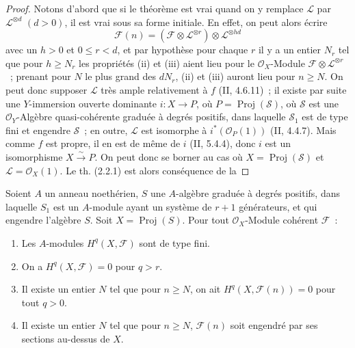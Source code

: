 \begin{proof}
Notons d'abord que si le théorème est vrai quand on y remplace
$\mathcal L$ par $\mathcal L^{\otimes d}$ $(d>0)$, il est vrai sous sa
forme initiale. En effet, on peut alors écrire
\[
\mathcal F(n)
=(\mathcal F\otimes\mathcal L^{\otimes r})
\otimes\mathcal L^{\otimes hd}
\]
avec un $h>0$ et $0\leq r<d$, et par hypothèse pour chaque $r$ il y a
un entier $N_r$ tel que pour $h\geq N_r$ les propriétés (ii) et (iii)
aient lieu pour le $\mathcal O_X$-Module
$\mathcal F\otimes\mathcal L^{\otimes r}$~; prenant pour $N$ le plus grand
des $dN_r$, (ii) et (iii) auront lieu pour $n\geq N$. On peut donc
supposer $\mathcal L$ très ample relativement à $f$ (II, 4.6.11)~; il
existe par suite une $Y$-immersion ouverte dominante
$i:X\to P$, où $P=\operatorname{Proj}(\mathcal S)$, où $\mathcal S$ est
une $\mathcal O_Y$-Algèbre quasi-cohérente graduée à degrés positifs, dans
laquelle $\mathcal S_1$ est de type fini et engendre $\mathcal S$~; en
outre, $\mathcal L$ est isomorphe à $i^*(\mathcal O_P(1))$ (II, 4.4.7).
Mais comme $f$ est propre, il en est de même de $i$ (II, 5.4.4), donc
$i$ est un isomorphisme $X\xrightarrow{\sim}P$. On peut donc se borner au
cas où $X=\operatorname{Proj}(\mathcal S)$ et
$\mathcal L=\mathcal O_X(1)$. Le th. (2.2.1) est alors conséquence de la
\end{proof}

\begin{proposition}[2.2.2]
\label{III.2.2.2-fr}
Soient $A$ un anneau noethérien, $S$ une $A$-algèbre graduée à degrés
positifs, dans laquelle $S_1$ est un $A$-module ayant un système de $r+1$
générateurs, et qui engendre l'algèbre $S$. Soit
$X=\operatorname{Proj}(S)$. Pour tout $\mathcal O_X$-Module cohérent
$\mathcal F$~:
\begin{enumerate}
\item[{\rm(i)}] Les $A$-modules $H^q(X,\mathcal F)$ sont de type fini.
\item[{\rm(ii)}] On a $H^q(X,\mathcal F)=0$ pour $q>r$.
\item[{\rm(iii)}] Il existe un entier $N$ tel que pour $n\geq N$, on ait
$H^q(X,\mathcal F(n))=0$ pour tout $q>0$.
\item[{\rm(iv)}] Il existe un entier $N$ tel que pour $n\geq N$,
$\mathcal F(n)$ soit engendré par ses sections au-dessus de $X$.
\end{enumerate}
\end{proposition}

